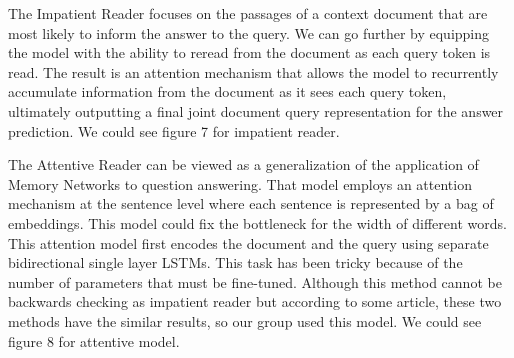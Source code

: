 \documentclass[runningheads,a4paper]{llncs}
\begin{document}



The Impatient Reader focuses on the passages of a context document that are most likely to inform the answer to the query. We can go further by equipping the model with the ability to reread from the document as each query token is read. The result is an attention mechanism that allows the model to recurrently accumulate information from the document as it sees each query token, ultimately outputting a final joint document query representation for the answer prediction. We could see figure 7 for impatient reader.

The Attentive Reader can be viewed as a generalization of the application of Memory Networks to question answering. That model employs an attention mechanism at the sentence level where each sentence is represented by a bag of embeddings. This model could fix the bottleneck for the width of different words. This attention model first encodes the document and the query using separate bidirectional single layer LSTMs. This task has been tricky because of the number of parameters that must be fine-tuned.
Although this method cannot be backwards checking as impatient reader but according to some article, these two methods have the similar results, so our group used this model. We could see figure 8 for attentive model.
\end{document}
